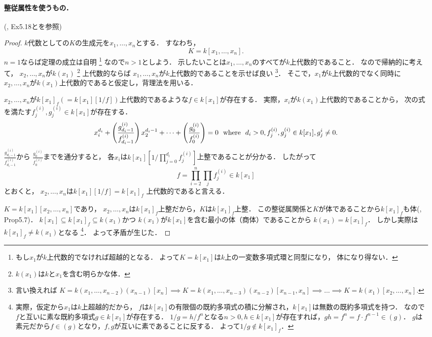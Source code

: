 \paragraph{整従属性を使うもの．}
(\cite{atimac}, Ex5.18と\cite{oneline}を参照)
\begin{proof}
    $k$代数としての$K$の生成元を$x_1,\dots,x_n$とする．
    すなわち，
    \[ K=k[x_1,\dots,x_n]. \]
    $n=1$ならば定理の成立は自明
    \footnote
    {
        もし$x_1$が$k$上代数的でなければ超越的となる．
        よって$K=k[x_1]$は$k$上の一変数多項式環と同型になり，
        体になり得ない．
    }
    なので$n>1$としよう．
    示したいことは$x_1,\dots,x_n$のすべてが$k$上代数的であること．
    なので帰納的に考えて，
    $x_2,\dots,x_n$が$k(x_1)$
    \footnote{$k(x_1)$は$k$と$x_1$を含む明らかな体．}
    上代数的ならば
    $x_1,\dots,x_n$が$k$上代数的であることを示せば良い
    \footnote
    {
        言い換えれば
        $K=k(x_1,\dots,x_{n-2})(x_{n-1})[x_n] 
        \implies
        K=k(x_1,\dots,x_{n-3})(x_{n-2})[x_{n-1},x_n]
        \implies
        \dots
        \implies K=k(x_1)[x_2,\dots,x_n]$.
    }．
    そこで，$x_1$が$k$上代数的でなく同時に
    $x_2,\dots,x_n$が$k(x_1)$上代数的であると仮定し，背理法を用いる．

    $x_2,\dots,x_n$が$k[x_1]_f(=k[x_1][1/f])$上代数的であるような$f \in k[x_1]$が存在する．
    実際，$x_i$が$k(x_1)$上代数的であることから，
    次の式を満たす$f_{j}^{(i)},g_{j}^{(i)} \in k[x_1]$が存在する．
    \[
        x_i^{d_i}+\left( \frac{g_{d_i-1}^{(i)}}{f_{d_i-1}^{(i)}} \right) x_2^{d_i-1}+\dots+\left(\frac{g_{0}^{(i)}}{f_{0}^{(i)}}\right)=0
        ~~\text{where}~~ d_i>0, f_{j}^{(i)},g_{j}^{(i)} \in k[x_1], g_{j}^{i} \neq 0.
    \]
    $\frac{g_{d_i-1}^{(i)}}{f_{d_i-1}^{(i)}}$から
    $\frac{g_{0}^{(i)}}{f_{0}^{(i)}}$までを通分すると，
    各$x_i$は$k[x_1]\left[1/\prod_{j=0}^{d_i}f_{j}^{(i)}\right]$上整であることが分かる．
    したがって
    \[ f=\prod_{i=2}^n\prod_{j} f_{j}^{(i)} \in k[x_1] \]とおくと，
    $x_2,\dots,x_n$は$k[x_1]\left[1/f\right]=k[x_1]_f$
    上代数的であると言える．

    $K=k[x_1][x_2,\dots,x_n]$であり，
    $x_2,\dots,x_n$は$k[x_1]_f$上整だから，$K$は$k[x_1]_f$上整．
    この整従属関係と$K$が体であることから$k[x_1]_f$も体(\cite{atimac}, Prop5.7)．
    $k[x_1] \subseteq k[x_1]_f \subseteq k(x_1)$かつ
    $k(x_1)$が$k[x_1]$を含む最小の体（商体）であることから
    $k(x_1)=k[x_1]_f$．
    しかし実際は$k[x_1]_f \neq k(x_1)$となる
    \footnote
    {
    実際，仮定から$x_1$は$k$上超越的だから，
    $f$は$k[x_1]$の有限個の既約多項式の積に分解され，$k[x_1]$は無数の既約多項式を持つ．
    なので$f$と互いに素な既約多項式$g \in k[x_1]$が存在する．
    $1/g=h/f^n$となる$n>0, h \in k[x_1]$が存在すれば，$gh=f^n=f \cdot f^{n-1} \in (g)$．
    $g$は素元だから$f \in (g)$となり，$f,g$が互いに素であることに反する．
    よって$1/g \not \in k[x_1]_f$．
    }．
    よって矛盾が生じた．
\end{proof}

